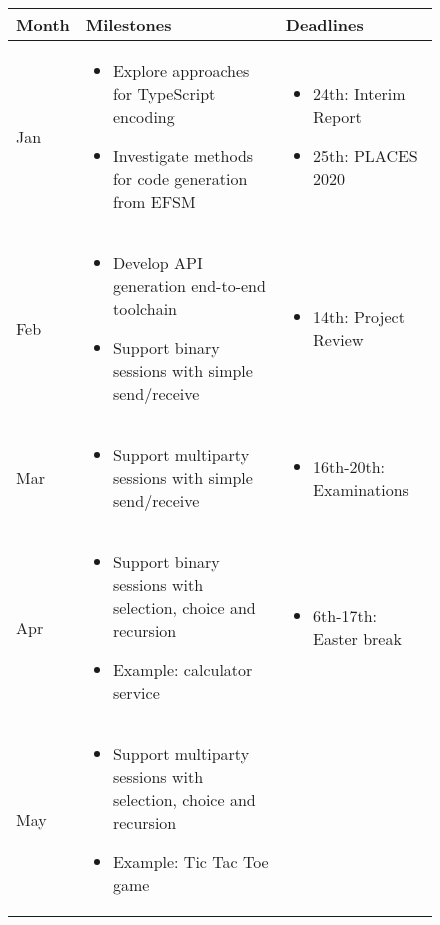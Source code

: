 \documentclass[12pt,twoside]{report}
\begin{document}
\begin{figure}
\centering
\begin{tabular}{l|p{}|p{}}
Month & Milestones & Deadlines \\
\hline\hline
Jan & \begin{itemize}
\item Explore approaches for TypeScript encoding
\item Investigate methods for code generation from EFSM
\end{itemize} & \begin{itemize}
\item 24th: Interim Report
\item 25th: PLACES 2020
\end{itemize} \\
\hline
Feb & \begin{itemize}
\item Develop API generation end-to-end toolchain
\item Support binary sessions with simple send/receive
\end{itemize} & \begin{itemize}
\item 14th: Project Review
\end{itemize} \\
\hline
Mar & \begin{itemize}
\item Support multiparty sessions with simple send/receive
\end{itemize} & \begin{itemize}
\item 16th-20th: Examinations
\end{itemize}\\
\hline
Apr & \begin{itemize}
\item Support binary sessions with selection, choice and recursion
\item Example: calculator service
\end{itemize} & \begin{itemize}
\item 6th-17th: Easter break
\end{itemize}\\
\hline
May & \begin{itemize}
\item Support multiparty sessions with selection, choice and recursion
\item Example: Tic Tac Toe game
\end{itemize} & \begin{itemize}

\end{itemize}
\end{tabular}
\end{figure}
\end{document}
